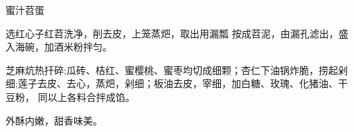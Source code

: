 \begin{recipe}[八宝苕蛋]{蜜汁苕蛋}

\ingredients


\preparation

\step 选红心子红苕洗净，削去皮，上笼蒸𤆵，取出用漏瓢 按成苕泥，由漏孔滤出，盛
入海碗，加酒米粉拌匀。

\step 芝麻炕热扦碎;瓜砖、桔红、蜜樱桃、蜜枣均切成细颗；杏仁下油锅炸脆，捞起剁
细;莲子去皮、去心，蒸𤆵，剁细；板油去皮，宰细，加白糖、玫瑰、化猪油、干豆粉，
同以上各料合拌成馅。

\features

外酥内嫩，甜香味美。

\end{recipe}


